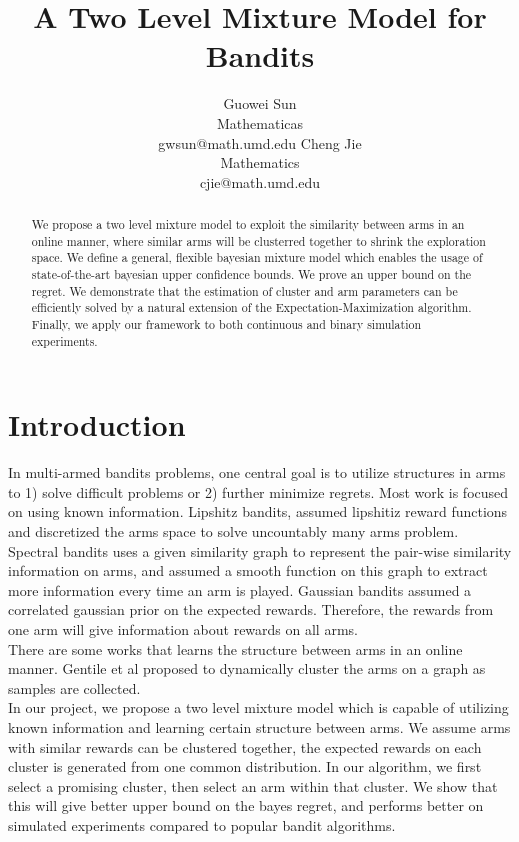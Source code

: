 \documentclass{article}
\title{ A Two Level Mixture Model for Bandits }
\author{
   Guowei Sun  \\ Mathematicas \\ gwsun@math.umd.edu
   \And 
   Cheng Jie \\Mathematics \\cjie@math.umd.edu
}
\begin{document}
\maketitle

\begin{abstract}
  We propose a two level mixture model to exploit the similarity between arms in an online manner, where similar arms will be clusterred together to shrink the exploration space. We define a general, flexible bayesian mixture model which enables the usage of state-of-the-art bayesian upper confidence bounds. We prove an upper bound on the regret. We demonstrate that the estimation of cluster and arm parameters can be efficiently solved by a natural extension of the Expectation-Maximization algorithm. Finally, we apply our framework to both continuous and binary simulation experiments.
\end{abstract}

\section{Introduction}
In multi-armed bandits problems, one central goal is to utilize structures in arms to 1) solve difficult problems or 2) further minimize regrets. Most work is focused on using known information. Lipshitz bandits\citep{lip1},\citep{slivkins} assumed lipshitiz reward functions and discretized the arms space to solve uncountably many arms problem. Spectral bandits uses a given similarity graph to represent the pair-wise similarity information on arms, and assumed a smooth function on this graph to extract more information every time an arm is played\citep{spectral}. Gaussian bandits assumed a correlated gaussian prior on the expected rewards. Therefore, the rewards from one arm will give information about rewards on all arms\citep{gaussian}.\\
There are some works that learns the structure between arms in an online manner. Gentile et al proposed to dynamically cluster the arms on a graph as samples are collected\citep{online}.  \\
In our project, we propose a two level mixture model which is capable of utilizing known information and learning certain structure between arms. We assume arms with similar rewards can be clustered together, the expected rewards on each cluster is generated from one common distribution. In our algorithm, we first select a promising cluster, then select an arm within that cluster.  We show that this will give better upper bound on the bayes regret, and performs better on simulated experiments compared to popular bandit algorithms.
 
\end{document}
